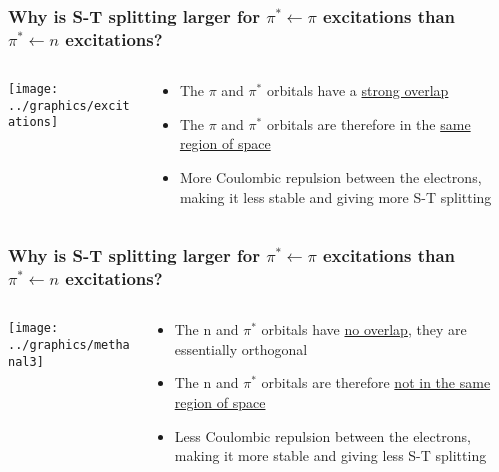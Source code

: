 \documentclass[ignorenonframetext]{beamer}
\begin{document}
\begin{frame}
\frametitle{Why is S-T splitting larger for \(\pi^* \leftarrow \pi\) excitations than \(\pi^* \leftarrow n\) excitations?}
\begin{columns}[onlytextwidth]
\begin{column}{.5\textwidth}
\texttt{[image: ../graphics/excitations]}
\end{column}
\begin{column}{.5\textwidth}
\begin{itemize}
\item The \(\pi\) and \(\pi^*\) orbitals have a \underline{strong overlap}
\item The \(\pi\) and \(\pi^*\) orbitals are therefore in the \underline{same region of space}
\item \hspace{5pt} More Coulombic repulsion between the electrons, making it less stable and giving more S-T splitting
\end{itemize}
\end{column}
\end{columns}
\end{frame}

\begin{frame}
\frametitle{Why is S-T splitting larger for \(\pi^* \leftarrow \pi\) excitations than \(\pi^* \leftarrow n\) excitations?}
\begin{columns}[onlytextwidth]
\begin{column}{.5\textwidth}
\texttt{[image: ../graphics/methanal3]}
\end{column}
\begin{column}{.5\textwidth}
\begin{itemize}
\item The n and \(\pi^*\) orbitals have \underline{no overlap}, they are essentially orthogonal
\item The n and \(\pi^*\) orbitals are therefore \underline{not in the same region of space}
\item \hspace{5pt} Less Coulombic repulsion between the electrons, making it more stable and giving less S-T splitting
\end{itemize}
\end{column}
\end{columns}
\end{frame}
\end{document}
